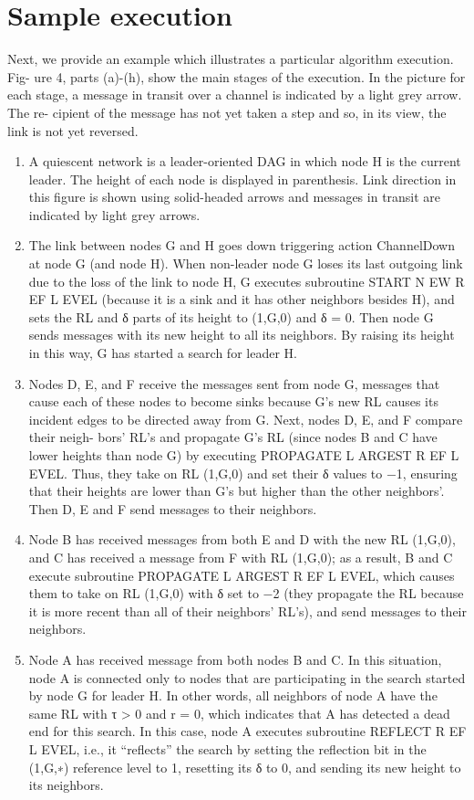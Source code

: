 \section{Sample execution}
Next, we provide an example which illustrates a particular algorithm execution. Fig- ure 4, parts (a)-(h), show the main stages of the execution. In the picture for each stage, a message in transit over a channel is indicated by a light grey arrow. The re- cipient of the message has not yet taken a step and so, in its view, the link is not yet reversed.
\begin{enumerate}[label=\alph*]
	\item A quiescent network is a leader-oriented DAG in which node H is the current leader. The height of each node is displayed in parenthesis. Link direction in this figure is shown using solid-headed arrows and messages in transit are indicated by light grey arrows.
	\item The link between nodes G and H goes down triggering action ChannelDown at node G (and node H). When non-leader node G loses its last outgoing link due to the loss of the link to node H, G executes subroutine START N EW R EF L EVEL (because it is a sink and it has other neighbors besides H), and sets the RL and δ parts of its height to (1,G,0) and δ = 0. Then node G sends messages with its new height to all its neighbors. By raising its height in this way, G has started a search for leader H.
	\item Nodes D, E, and F receive the messages sent from node G, messages that cause each of these nodes to become sinks because G’s new RL causes its incident edges to be directed away from G. Next, nodes D, E, and F compare their neigh- bors’ RL’s and propagate G’s RL (since nodes B and C have lower heights than node G) by executing PROPAGATE L ARGEST R EF L EVEL. Thus, they take on RL (1,G,0) and set their δ values to −1, ensuring that their heights are lower than G’s but higher than the other neighbors’. Then D, E and F send messages to their neighbors.
	\item Node B has received messages from both E and D with the new RL (1,G,0), and C has received a message from F with RL (1,G,0); as a result, B and C execute subroutine PROPAGATE L ARGEST R EF L EVEL, which causes them to take on RL (1,G,0) with δ set to −2 (they propagate the RL because it is more recent than all of their neighbors’ RL’s), and send messages to their neighbors.
	\item Node A has received message from both nodes B and C. In this situation, node A is connected only to nodes that are participating in the search started by node G for leader H. In other words, all neighbors of node A have the same RL with τ > 0 and r = 0, which indicates that A has detected a dead end for this search. In this case, node A executes subroutine REFLECT R EF L EVEL, i.e., it “reflects” the search by setting the reflection bit in the (1,G,∗) reference level to 1, resetting its δ to 0, and sending its new height to its neighbors.

\end{enumerate}
